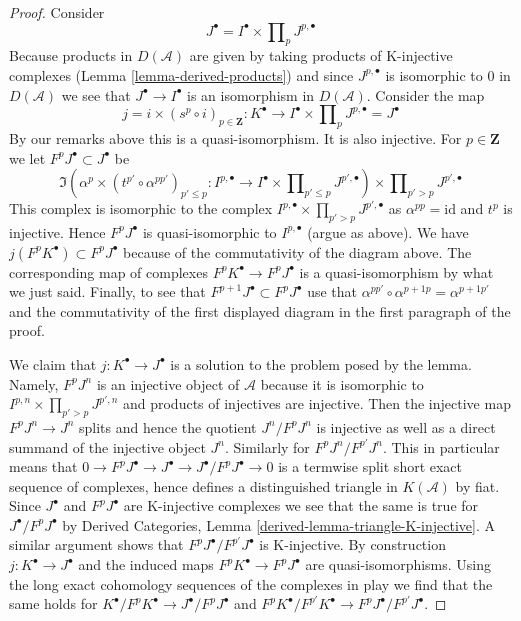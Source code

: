 \begin{proof}
\medskip\noindent
Consider
$$
J^\bullet = I^\bullet \times \prod\nolimits_p J^{p, \bullet}
$$
Because products in $D(\mathcal{A})$ are given by taking
products of K-injective complexes
(Lemma \ref{lemma-derived-products})
and since $J^{p, \bullet}$
is isomorphic to $0$ in $D(\mathcal{A})$ we see that
$J^\bullet \to I^\bullet$ is an isomorphism in $D(\mathcal{A})$.
Consider the map
$$
j = i \times (s^p \circ i)_{p \in \mathbf{Z}} :
K^\bullet
\longrightarrow
I^\bullet \times \prod\nolimits_p J^{p, \bullet} = J^\bullet
$$
By our remarks above this is a quasi-isomorphism. It is also injective.
For $p \in \mathbf{Z}$ we let $F^pJ^\bullet \subset J^\bullet$ be
$$
\Im\left(
\alpha^p \times (t^{p'} \circ \alpha^{pp'})_{p' \leq p} :
I^{p, \bullet}
\to
I^\bullet \times \prod\nolimits_{p' \leq p} J^{p', \bullet}
\right)
\times \prod\nolimits_{p' > p} J^{p', \bullet}
$$
This complex is isomorphic to the complex
$I^{p, \bullet} \times \prod_{p' > p} J^{p', \bullet}$
as $\alpha^{pp} = \text{id}$ and $t^p$ is injective.
Hence $F^pJ^\bullet$ is quasi-isomorphic to $I^{p, \bullet}$ (argue
as above). We have $j(F^pK^\bullet) \subset F^pJ^\bullet$ because
of the commutativity of the diagram above. The corresponding
map of complexes $F^pK^\bullet \to F^pJ^\bullet$ is a quasi-isomorphism
by what we just said. Finally, to see that
$F^{p + 1}J^\bullet \subset F^pJ^\bullet$
use that $\alpha^{pp'} \circ \alpha^{p + 1p} = \alpha^{p + 1p'}$
and the commutativity of the first displayed diagram
in the first paragraph of the proof.

\medskip\noindent
We claim that $j : K^\bullet \to J^\bullet$ is a solution to the
problem posed by the lemma. Namely, $F^pJ^n$ is an injective object
of $\mathcal{A}$ because it is isomorphic to
$I^{p, n} \times \prod_{p' > p} J^{p', n}$ and products of
injectives are injective. Then the injective map $F^pJ^n \to J^n$
splits and hence the quotient $J^n/F^pJ^n$ is injective as well
as a direct summand of the injective object $J^n$.
Similarly for $F^pJ^n/F^{p'}J^n$. This in particular means
that $0 \to F^pJ^\bullet \to J^\bullet \to J^\bullet/F^pJ^\bullet \to 0$
is a termwise split short exact sequence of complexes, hence defines
a distinguished triangle in $K(\mathcal{A})$ by fiat.
Since $J^\bullet$ and $F^pJ^\bullet$ are K-injective complexes
we see that the same is true for $J^\bullet/F^pJ^\bullet$
by Derived Categories, Lemma \ref{derived-lemma-triangle-K-injective}.
A similar argument shows that $F^pJ^\bullet/F^{p'}J^\bullet$
is K-injective. By construction $j : K^\bullet \to J^\bullet$
and the induced maps $F^pK^\bullet \to F^pJ^\bullet$ are
quasi-isomorphisms. Using the long exact cohomology sequences
of the complexes in play we find that the same holds for
$K^\bullet/F^pK^\bullet \to J^\bullet/F^pJ^\bullet$ and
$F^pK^\bullet/F^{p'}K^\bullet \to F^pJ^\bullet/F^{p'}J^\bullet$.
\end{proof}

